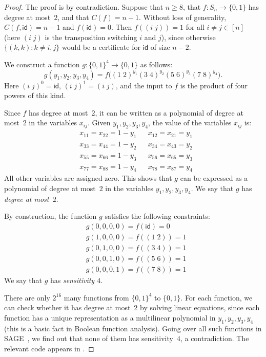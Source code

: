 \documentclass[10pt,a4paper]{article}
\theoremstyle{definition}
\providecommand{\id}{\mathsf{id}}
\begin{document}
\begin{proof}
The proof is by contradiction. Suppose that $n \geq 8$, that $f\colon S_n \to \{0,1\}$ has degree at most~$2$, and that $C(f) = n-1$. Without loss of generality, $C(f,\id) = n-1$ and $f(\id) = 0$. Then $f((i\;j)) = 1$  for all $i \neq j \in [n]$ (here $(i\;j)$ is the transposition switching $i$ and $j$), since otherwise $\{(k,k) : k \neq i,j\}$ would be a certificate for $\id$ of size $n-2$.

We construct a function $g\colon \{0,1\}^4 \to \{0,1\}$ as follows:
\[
 g(y_1,y_2,y_3,y_4) = f\bigl((1\;2)^{y_1} (3\;4)^{y_2} (5\;6)^{y_3} (7\;8)^{y_4}\bigr).
\]
Here $(i\;j)^0 = \id$, $(i\;j)^1 = (i\;j)$, and the input to $f$ is the product of four powers of this kind.

Since $f$ has degree at most~$2$, it can be written as a polynomial of degree at most~$2$ in the variables $x_{ij}$. Given $y_1,y_2,y_3,y_4$, the value of the variables $x_{ij}$ is:
\begin{align*}
    &x_{11} = x_{22} = 1-y_1 && x_{12} = x_{21} = y_1 \\
    &x_{33} = x_{44} = 1-y_2 && x_{34} = x_{43} = y_2 \\
    &x_{55} = x_{66} = 1-y_3 && x_{56} = x_{65} = y_3 \\
    &x_{77} = x_{88} = 1-y_4 && x_{78} = x_{87} = y_4 
\end{align*}
All other variables are assigned zero. This shows that $g$ can be expressed as a polynomial of degree at most~$2$ in the variables $y_1,y_2,y_3,y_4$. We say that $g$ has \emph{degree at most~$2$}. 

By construction, the function $g$ satisfies the following constraints:
\begin{align*}
    &g(0,0,0,0) = f(\id) = 0 \\
    &g(1,0,0,0) = f((1\;2)) = 1 \\
    &g(0,1,0,0) = f((3\;4)) = 1 \\
    &g(0,0,1,0) = f((5\;6)) = 1 \\
    &g(0,0,0,1) = f((7\;8)) = 1 
\end{align*}
We say that $g$ has \emph{sensitivity $4$}.

There are only $2^{16}$ many functions from $\{0,1\}^4$ to $\{0,1\}$. For each function, we can check whether it has degree at most~$2$ by solving linear equations, since each function has a unique representation as a multilinear polynomial in $y_1,y_2,y_3,y_4$ (this is a basic fact in Boolean function analysis). Going over all such functions in SAGE~\cite{sagemath}, we find out that none of them has sensitivity~$4$, a contradiction. The relevant code appears in . 
\end{proof}
\end{document}

